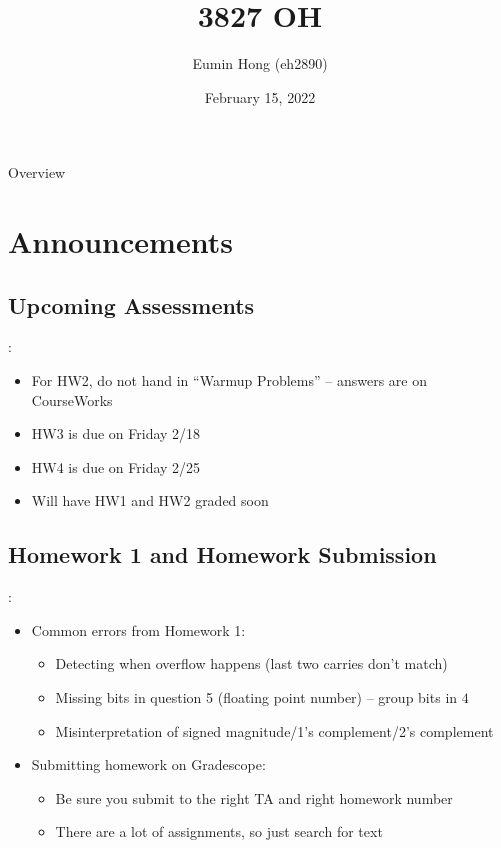 \documentclass{../slides}
\title{3827 OH}
\author{Eumin Hong (eh2890)}
\institute{Columbia University}
\date{February 15, 2022}
\begin{document}
\begin{frame}
    \titlepage
\end{frame}

\begin{frame}{Overview}
\begin{multicols}{2}
\tableofcontents
\end{multicols}
\end{frame}

\section{Announcements}
\subsection{Upcoming Assessments}
\begin{frame}{\secname: \subsecname}
    \begin{itemize}
        \item For HW2, do not hand in \enquote{Warmup Problems} -- answers are on CourseWorks
        \item HW3 is due on Friday 2/18
        \item HW4 is due on Friday 2/25
        \item Will have HW1 and HW2 graded soon
    \end{itemize}
\end{frame}

\subsection{Homework 1 and Homework Submission}
\begin{frame}{\secname: \subsecname}
    \begin{itemize}
        \item Common errors from Homework 1:
        \begin{itemize}
            \item Detecting when overflow happens (last two carries don't match)
            \item Missing bits in question 5 (floating point number) -- group bits in $4$
            \item Misinterpretation of signed magnitude/1's complement/2's complement
        \end{itemize}
        \item Submitting homework on Gradescope:
        \begin{itemize}
            \item Be sure you submit to the right TA and right homework number
            \item There are a lot of assignments, so just search for text
        \end{itemize}
    \end{itemize}
\end{frame}
\end{document}
